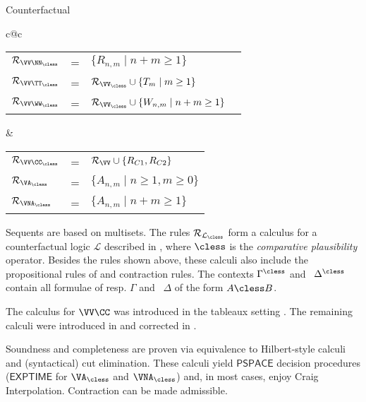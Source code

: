 \begin{entry}{Counterfactual}
\begin{calculus}
\begin{center}
\begin{tabular}{c@{\qquad}c}
  \\
\begin{tabular}{lll}
$\Rules_{\VV\NN_\cless}$ & = & $\{ R_{n,m} \mid n+m \geq 1\}$\\
$\Rules_{\VV\TT_\cless}$ & = & $\Rules_{\VV_\cless}\cup \{T_m \mid m \geq 1\}$\\
$\Rules_{\VV\WW_\cless}$ & = &$\Rules_{\VV_\cless}\cup \{W_{n,m}\mid n
+ m \geq 1\}\quad$
\end{tabular} &
\begin{tabular}{lll}
$\Rules_{\VV\CC_\cless}$ & = & $\Rules_\VV\cup\{R_{C1},R_{C2}\}$\\
$\Rules_{\VA_\cless}$ & = & $\{ A_{n,m} \mid n\geq 1, m\geq 0 \}$\\
$\Rules_{\VNA_\cless}$ & = & $\{ A_{n,m} \mid n + m\geq 1 \}$
\end{tabular}
\end{tabular}
\end{center}


\end{calculus}


\begin{clarifications}
  Sequents are based on multisets. The rules $\Rules_{\mathcal{L}_\cless}$ 
  form a calculus for a counterfactual logic $\mathcal{L}$ described 
  in \cite{Lewis:1973uq}, where $\cless$ is the \emph{comparative plausibility} 
  operator. Besides the rules shown above, these calculi also include the 
  propositional rules of
  \Gtc {} and contraction rules. The contexts $\Gamma^\cless$ and \
  $\Delta^\cless$ contain all formulae of resp. $\Gamma$ and \ $\Delta$ of
  the form $A \cless B$.
\end{clarifications}

\begin{history}
  The calculus for $\VV\CC$ was introduced in the tableaux setting
  \cite{Swart:1983uq,Gent:1992p3090}. The remaining calculi were
  introduced in \cite{Lellmann:2012fk,Lellmann:2013fk} and corrected
  in \cite{Lellmann:2013}.
\end{history}

\begin{technicalities}
  Soundness and completeness are proven via equivalence to 
  Hilbert-style calculi and (syntactical) cut elimination. 
  These calculi yield $\mathsf{PSPACE}$ decision
  procedures ($\mathsf{EXPTIME}$ for $\VA_\cless$ and
  $\VNA_\cless$) and, in most cases, enjoy Craig Interpolation. 
  Contraction can be made admissible. %
\end{technicalities}

\clearpage

\end{entry}

